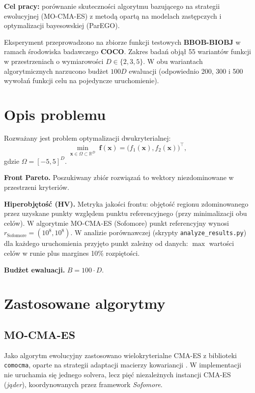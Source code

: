 \documentclass[default]{sn-jnl}
\begin{document}
\textbf{Cel pracy:} porównanie skuteczności algorytmu bazującego na strategii ewolucyjnej (MO-CMA-ES) z metodą opartą na modelach zastępczych i optymalizacji bayesowskiej (ParEGO).

Eksperyment przeprowadzono na zbiorze funkcji testowych \textbf{BBOB-BIOBJ} w ramach środowiska badawczego \textbf{COCO}. Zakres badań objął 55 wariantów funkcji w przestrzeniach o wymiarowości $D \in \{2, 3, 5\}$. W obu wariantach algorytmicznych narzucono budżet $100D$ ewaluacji (odpowiednio 200, 300 i 500 wywołań funkcji celu na pojedyncze uruchomienie).

\section{Opis problemu}\label{sec:problem}

Rozważany jest problem optymalizacji dwukryterialnej:
\begin{equation}
  \min_{\mathbf{x} \in \Omega \subset \mathbb{R}^D} \;
  \mathbf{f}(\mathbf{x}) = \bigl(f_1(\mathbf{x}), f_2(\mathbf{x})\bigr)^\top,
\end{equation}
gdzie $\Omega = [-5, 5]^D$.

\textbf{Front Pareto.} Poszukiwany zbiór rozwiązań to wektory niezdominowane w przestrzeni kryteriów.

\textbf{Hiperobjętość (HV).} Metryka jakości frontu: objętość regionu zdominowanego przez uzyskane punkty względem punktu referencyjnego (przy minimalizacji obu celów). W algorytmie MO-CMA-ES (Sofomore) punkt referencyjny wynosi $r_{\mathrm{Sofomore}} = (10^8, 10^8)$. W analizie porównawczej (skrypty \texttt{analyze\_results.py}) dla każdego uruchomienia przyjęto punkt zależny od danych: $\max$ wartości celów w runie plus margines 10\% rozpiętości.

\textbf{Budżet ewaluacji.} $B = 100 \cdot D$.

\section{Zastosowane algorytmy}\label{sec:algorytmy}

\subsection{MO-CMA-ES}

Jako algorytm ewolucyjny zastosowano wielokryterialne CMA-ES z biblioteki
\texttt{comocma}, oparte na strategii adaptacji macierzy kowariancji
\cite{Hansen2001}. W implementacji nie uruchamia się jednego solvera,
lecz pięć niezależnych instancji CMA-ES (\textit{jąder}), koordynowanych
przez framework \textit{Sofomore}.
\end{document}
